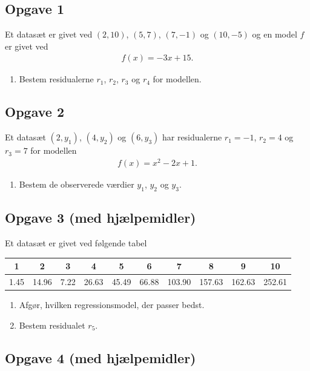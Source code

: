 \documentclass[12pt]{article}
\begin{document}
\subsection*{Opgave 1}
Et datasæt er givet ved $(2,10)$, $(5,7)$, $(7,-1)$ og $(10,-5)$ og en model $f$ er givet ved
\begin{align*}
	f(x) = -3x + 15.
\end{align*}
\begin{enumerate}[label=\roman*)]
	\item Bestem residualerne $r_1$, $r_2$, $r_3$ og $r_4$ for modellen. 
\end{enumerate}

\subsection*{Opgave 2}
Et datasæt $(2,y_1)$, $(4,y_2)$ og $(6,y_3)$ har residualerne $r_1 = -1$, $r_2 = 4$ og $r_3 = 7$ for modellen
\begin{align*}
	f(x) = x^2 -2x + 1.
\end{align*}
\begin{enumerate}[label=\roman*)]
	\item Bestem de observerede værdier $y_1$, $y_2$ og $y_3$.
\end{enumerate}



\subsection*{Opgave 3 (med hjælpemidler)}

Et datasæt er givet ved følgende tabel
\begin{center}
\begin{tabular}{c|c|c|c|c|c|c|c|c|c}
1 & 2 & 3 & 4 & 5 & 6 & 7 & 8 & 9 & 10\\ \hline
1.45 & 14.96 & 7.22 & 26.63 & 45.49 & 66.88 & 103.90&157.63 & 162.63 & 252.61
\end{tabular}
\end{center}

\begin{enumerate}[label=\roman*)]
	\item Afgør, hvilken regressionsmodel, der passer bedst.
	\item Bestem residualet $r_5$. 
\end{enumerate}

\subsection*{Opgave 4 (med hjælpemidler)}
\end{document}
